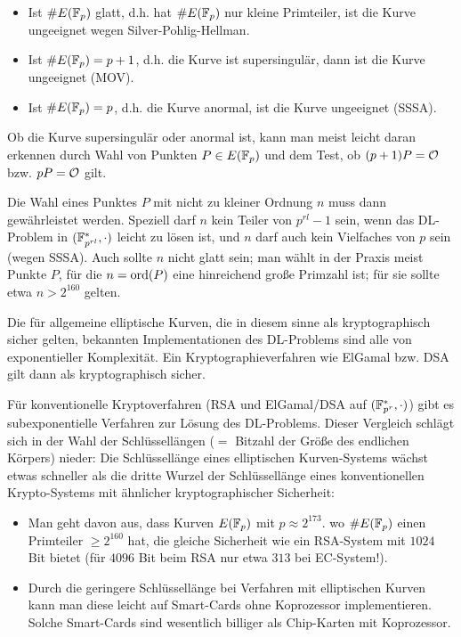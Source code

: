 \begin{bem}
	\begin{itemize}
		\item Ist $\#E(\mathbb{F}_p)$ glatt, d.h. hat $\#E(\mathbb{F}_p)$ nur kleine Primteiler, ist die Kurve ungeeignet wegen Silver-Pohlig-Hellman.
		\item Ist $\#E(\mathbb{F}_p) = p+1$, d.h. die Kurve ist supersingulär, dann ist die Kurve ungeeignet (MOV).
		\item Ist $\#E(\mathbb{F}_p) = p$, d.h. die Kurve anormal, ist die Kurve ungeeignet (SSSA).
	\end{itemize}
	Ob die Kurve supersingulär oder anormal ist, kann man meist leicht daran erkennen durch Wahl von Punkten $P \in E(\mathbb{F}_p)$ und dem Test, ob $(p+1)P = \mathcal{O}$ bzw. $pP = \mathcal{O}$ gilt.
\end{bem}

\begin{bem}
	Die Wahl eines Punktes $P$ mit nicht zu kleiner Ordnung $n$ muss dann gewährleistet werden.
	Speziell darf $n$ kein Teiler von $p^{rl} - 1$ sein, wenn das DL-Problem in $(\mathbb{F}_{p^{rl}}^*,\cdot)$ leicht zu lösen ist, und $n$ darf auch kein Vielfaches von $p$ sein (wegen SSSA).
	Auch sollte $n$ nicht glatt sein; man wählt in der Praxis meist Punkte $P$, für die $n = \operatorname{ord}(P)$ eine hinreichend große Primzahl ist; für sie sollte etwa $n > 2^{160}$ gelten.
\end{bem}

\begin{bem}
	Die für allgemeine elliptische Kurven, die in diesem sinne als kryptographisch sicher gelten, bekannten Implementationen des DL-Problems sind alle von exponentieller Komplexität.
	Ein Kryptographieverfahren wie ElGamal bzw. DSA gilt dann als kryptographisch sicher.
\end{bem}

\begin{bem}
	Für konventionelle Kryptoverfahren (RSA und ElGamal/DSA auf $(\mathbb{F}_{p^r}^*,\cdot)$) gibt es subexponentielle Verfahren zur Lösung des DL-Problems. Dieser Vergleich schlägt sich in der Wahl der Schlüssellängen ($=$ Bitzahl der Größe des endlichen Körpers) nieder:
	Die Schlüssellänge eines elliptischen Kurven-Systems wächst etwas schneller als die dritte Wurzel der Schlüssellänge eines konventionellen Krypto-Systems mit ähnlicher kryptographischer Sicherheit: 
\end{bem}

\begin{bem}
	\begin{itemize}
		\item Man geht davon aus, dass Kurven $E(\mathbb{F}_p)$ mit $p \approx 2^{173}$. wo $\#E(\mathbb{F}_p)$ einen Primteiler $\geq 2^{160}$ hat, die gleiche Sicherheit wie ein RSA-System mit $1024$ Bit bietet (für $4096$ Bit beim RSA nur etwa $313$ bei EC-System!).
		\item Durch die geringere Schlüssellänge bei Verfahren mit elliptischen Kurven kann man diese leicht auf Smart-Cards ohne Koprozessor implementieren.
		Solche Smart-Cards sind wesentlich billiger als Chip-Karten mit Koprozessor.
	\end{itemize}
\end{bem}

